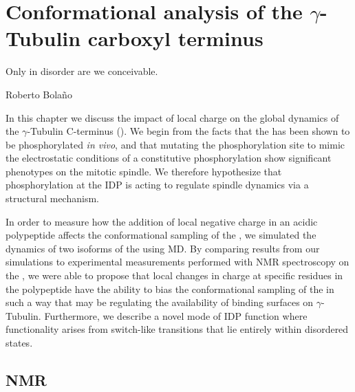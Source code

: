 \chapter{Conformational analysis of the $\gamma$-Tubulin carboxyl terminus}

\epigraph{Only in disorder are we conceivable.}{Roberto Bola\~no}

In this chapter we discuss the impact of local charge on the global dynamics of the $\gamma$-Tubulin C-terminus (\gct). We begin from the facts that the \gct has been shown to be phosphorylated {\it in vivo}, and that mutating the phosphorylation site to mimic the electrostatic conditions of a constitutive phosphorylation show significant phenotypes on the mitotic spindle. We therefore hypothesize that phosphorylation at the \gct IDP is acting to regulate spindle dynamics via a structural mechanism.

In order to measure how the addition of local negative charge in an acidic polypeptide affects the conformational sampling of the \gct, we simulated the dynamics of two isoforms of the \gct using MD. By comparing results from our simulations to experimental measurements performed with NMR spectroscopy on the \gct, we were able to propose that local changes in charge at specific residues in the polypeptide have the ability to bias the conformational sampling of the \gct in such a way that may be regulating the availability of binding surfaces on $\gamma$-Tubulin. Furthermore, we describe a novel mode of IDP function where functionality arises from switch-like transitions that lie entirely within disordered states.

\section{NMR}

